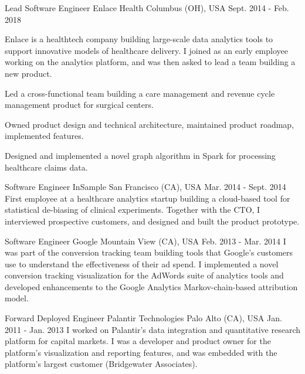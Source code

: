 \begin{cventries}
  \cventry
    {Lead Software Engineer} %
    {Enlace Health} %
    {Columbus (OH), USA} %
    {Sept. 2014 - Feb. 2018} %
    {
      Enlace is a healthtech company building large-scale data analytics tools to support innovative models of healthcare delivery. I joined as an early employee working on the  analytics platform, and was then asked to lead a team building a new product.
      \vspace{5.0mm}
      \begin{cvitems} %
        \item {Led a cross-functional team building a care management and revenue cycle management product for surgical centers.}
        \item {Owned product design and technical architecture, maintained product roadmap, implemented features.}
        \item {Designed and implemented a novel graph algorithm in Spark for processing healthcare claims data.}
      \end{cvitems}
    }

  \cventry
    {Software Engineer} %
    {InSample} %
    {San Francisco (CA), USA} %
    {Mar. 2014 - Sept. 2014} %
    {
      First employee at a healthcare analytics startup building a cloud-based tool for statistical de-biasing of clinical experiments. Together with the CTO, I interviewed prospective customers, and designed and built the product prototype.
      \vspace{3.0mm}
    }

  \cventry
    {Software Engineer} %
    {Google} %
    {Mountain View (CA), USA} %
    {Feb. 2013 - Mar. 2014} %
    {
      I was part of the conversion tracking team building tools that Google's customers use to understand the effectiveness of their ad spend. I implemented a novel conversion tracking visualization for the AdWords suite of analytics tools and developed enhancements to the Google Analytics Markov-chain-based attribution model.
      \vspace{3.0mm}
    }

  \cventry
    {Forward Deployed Engineer} %
    {Palantir Technologies} %
    {Palo Alto (CA), USA} %
    {Jan. 2011 - Jan. 2013} %
    {
      I worked on Palantir's data integration and quantitative research platform for capital markets. I was a developer and product owner for the platform's visualization and reporting features, and was embedded with the platform's largest customer (Bridgewater Associates).
    }

\end{cventries}

